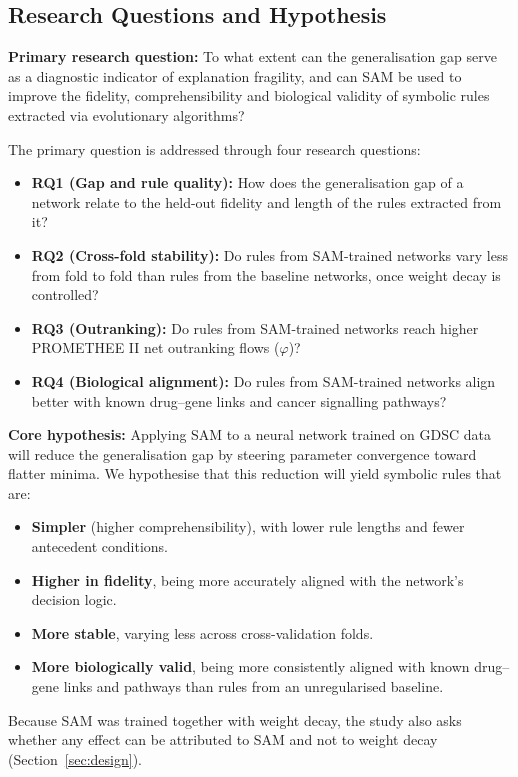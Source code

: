 \subsection{Research Questions and Hypothesis}\label{sec:rqs}
\textbf{Primary research question:} To what extent can the generalisation gap serve as a diagnostic indicator of explanation fragility, and can SAM be used to improve the fidelity, comprehensibility and biological validity of symbolic rules extracted via evolutionary algorithms?

The primary question is addressed through four research questions:
\begin{itemize}
  \item \textbf{RQ1 (Gap and rule quality):} How does the generalisation gap of a network relate to the held-out fidelity and length of the rules extracted from it?
  \item \textbf{RQ2 (Cross-fold stability):} Do rules from SAM-trained networks vary less from fold to fold than rules from the baseline networks, once weight decay is controlled?
  \item \textbf{RQ3 (Outranking):} Do rules from SAM-trained networks reach higher PROMETHEE II net outranking flows ($\varphi$)?
  \item \textbf{RQ4 (Biological alignment):} Do rules from SAM-trained networks align better with known drug--gene links and cancer signalling pathways?
\end{itemize}

\textbf{Core hypothesis:} Applying SAM to a neural network trained on GDSC data will reduce the generalisation gap by steering parameter convergence toward flatter minima. We hypothesise that this reduction will yield symbolic rules that are:
\begin{itemize}
  \item \textbf{Simpler} (higher comprehensibility), with lower rule lengths and fewer antecedent conditions.
  \item \textbf{Higher in fidelity}, being more accurately aligned with the network's decision logic.
  \item \textbf{More stable}, varying less across cross-validation folds.
  \item \textbf{More biologically valid}, being more consistently aligned with known drug--gene links and pathways than rules from an unregularised baseline.
\end{itemize}

Because SAM was trained together with weight decay, the study also asks whether any effect can be attributed to SAM and not to weight decay (Section~\ref{sec:design}).

